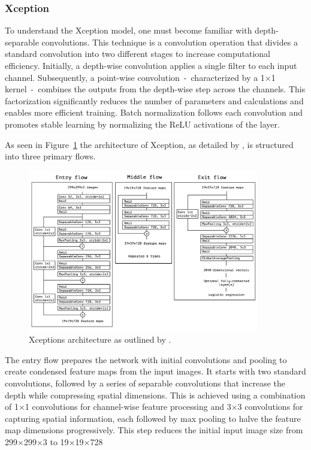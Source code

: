 \subsubsection{Xception}\label{xception}

To understand the Xception model, one must become familiar with depth-separable convolutions. This technique is a convolution operation that divides a standard convolution into two different stages to increase computational efficiency. Initially, a depth-wise convolution applies a single filter to each input channel. Subsequently, a point-wise convolution~-~characterized by a 1$\times$1 kernel~-~combines the outputs from the depth-wise step across the channels. This factorization significantly reduces the number of parameters and calculations and enables more efficient training. Batch normalization follows each convolution and promotes stable learning by normalizing the ReLU activations of the layer.

As seen in Figure~\ref{fig:xceptionArchitecture} the architecture of Xception, as detailed by \citep{chollet2017xception}, is structured into three primary flows.

\begin{figure}
    \centering
    \includegraphics[width=0.9\textwidth]{figures/xception_architecture.png}
    \caption{Xceptions architecture as outlined by \citeauthor{chollet2017xception}.}\label{fig:xceptionArchitecture}
\end{figure}

The entry flow prepares the network with initial convolutions and pooling to create condensed feature maps from the input images. It starts with two standard convolutions, followed by a series of separable convolutions that increase the depth while compressing spatial dimensions. This is achieved using a combination of 1$\times$1 convolutions for channel-wise feature processing and 3$\times$3 convolutions for capturing spatial information, each followed by max pooling to halve the feature map dimensions progressively. This step reduces the initial input image size from 299$\times$299$\times$3 to 19$\times$19$\times$728

